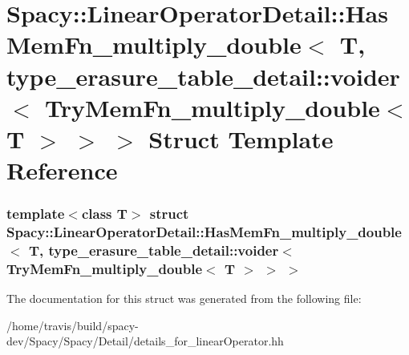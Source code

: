 \hypertarget{structSpacy_1_1LinearOperatorDetail_1_1HasMemFn__multiply__double_3_01T_00_01type__erasure__tabl89d23c7a799f453af759499ec9ea18b0}{\section{\-Spacy\-:\-:\-Linear\-Operator\-Detail\-:\-:\-Has\-Mem\-Fn\-\_\-multiply\-\_\-double$<$ \-T, type\-\_\-erasure\-\_\-table\-\_\-detail\-:\-:voider$<$ \-Try\-Mem\-Fn\-\_\-multiply\-\_\-double$<$ \-T $>$ $>$ $>$ \-Struct \-Template \-Reference}
\label{structSpacy_1_1LinearOperatorDetail_1_1HasMemFn__multiply__double_3_01T_00_01type__erasure__tabl89d23c7a799f453af759499ec9ea18b0}
}
\subsubsection*{template$<$class T$>$ struct Spacy\-::\-Linear\-Operator\-Detail\-::\-Has\-Mem\-Fn\-\_\-multiply\-\_\-double$<$ T, type\-\_\-erasure\-\_\-table\-\_\-detail\-::voider$<$ Try\-Mem\-Fn\-\_\-multiply\-\_\-double$<$ T $>$ $>$ $>$}



\-The documentation for this struct was generated from the following file\-:\begin{DoxyCompactItemize}
\item 
/home/travis/build/spacy-\/dev/\-Spacy/\-Spacy/\-Detail/details\-\_\-for\-\_\-linear\-Operator.\-hh\end{DoxyCompactItemize}
